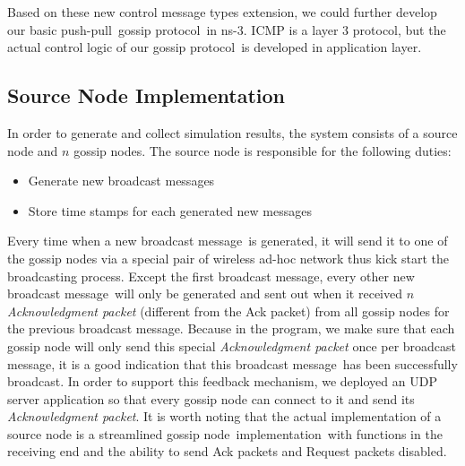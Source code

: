 \documentclass[onehalf,11pt]{beavtex}
\newcommand{\gp}{gossip protocol}
\newcommand{\msgs}{messages}
\newcommand{\msg}{message}
\newcommand{\pp}{push-pull}
\newcommand{\gn}{gossip node}
\newcommand{\im}{implementation}
\begin{document}
Based on these new control message types extension, we could further develop our basic \pp  ~\gp ~in ns-3. ICMP is a layer 3 protocol, but the actual control logic of our \gp ~is developed in application layer. 

\subsection{Source Node Implementation}
In order to generate and collect simulation results, the system consists of a source node and $n$ gossip nodes. The source node is responsible for the following duties:

\begin{itemize}
	\item Generate new broadcast \msgs
	\item Store time stamps for each generated new \msgs
\end{itemize}

Every time when a new broadcast \msg ~is generated, it will send it to one of the gossip nodes via a special pair of wireless ad-hoc network thus kick start the broadcasting process. Except the first broadcast \msg, every other new broadcast \msg ~will only be generated and sent out when it received $n$ \emph{Acknowledgment packet} (different from the Ack packet) from all gossip nodes for the previous broadcast \msg. Because in the program, we make sure that each gossip node will only send this special \emph{Acknowledgment packet }once per broadcast \msg, it is a good indication that this broadcast \msg ~has been successfully broadcast. In order to support this feedback mechanism, we deployed an UDP server application so that every gossip node can connect to it and send its \emph{Acknowledgment packet}. It is worth noting that the actual implementation of a source node is a streamlined \gn ~\im ~with functions in the receiving end and the ability to send Ack packets and Request packets disabled. 
\end{document}
